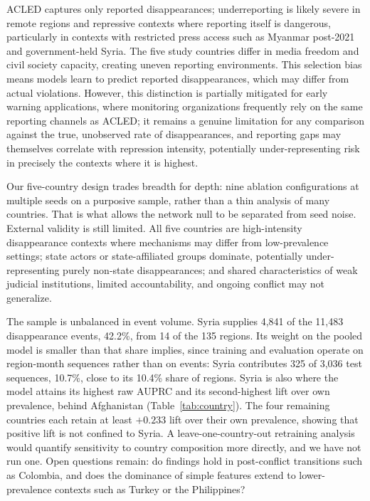 \documentclass[pdflatex,sn-mathphys-num]{sn-jnl}%
\theoremstyle{thmstyleone}%
\theoremstyle{thmstyletwo}%
\theoremstyle{thmstylethree}%
\begin{document}
ACLED captures only reported disappearances; underreporting is likely severe in remote regions and repressive contexts where reporting itself is dangerous, 
particularly in contexts with restricted press access such as Myanmar post-2021 and government-held Syria. The five study countries differ in media freedom and civil society capacity, creating uneven reporting environments. This selection bias means models learn to predict reported disappearances, which may differ from actual violations. However, this distinction is partially mitigated for early warning applications, where monitoring organizations frequently rely on the same reporting channels as ACLED; it remains a genuine limitation for any comparison against the true, unobserved rate of disappearances, and reporting gaps may themselves correlate with repression intensity, potentially under-representing risk in precisely the contexts where it is highest.

Our five-country design trades breadth for depth: nine ablation configurations at multiple seeds on a purposive sample, rather than a thin analysis of many countries. That is what allows the network null to be separated from seed noise. External validity is still limited. All five countries are high-intensity disappearance contexts where mechanisms may differ from low-prevalence settings; state actors or state-affiliated groups dominate, potentially under-representing purely non-state disappearances; and shared characteristics of weak judicial institutions, limited accountability, and ongoing conflict may not generalize.

The sample is unbalanced in event volume. Syria supplies 4,841 of the 11,483 disappearance events, 42.2\%, from 14 of the 135 regions. Its weight on the pooled model is smaller than that share implies, since training and evaluation operate on region-month sequences rather than on events: Syria contributes 325 of 3,036 test sequences, 10.7\%, close to its 10.4\% share of regions. Syria is also where the model attains its highest raw AUPRC and its second-highest lift over own prevalence, behind Afghanistan (Table~\ref{tab:country}). The four remaining countries each retain at least $+0.233$ lift over their own prevalence, showing that positive lift is not confined to Syria. A leave-one-country-out retraining analysis would quantify sensitivity to country composition more directly, and we have not run one. Open questions remain: do findings hold in post-conflict transitions such as Colombia, and does the dominance of simple features extend to lower-prevalence contexts such as Turkey or the Philippines?
\end{document}
